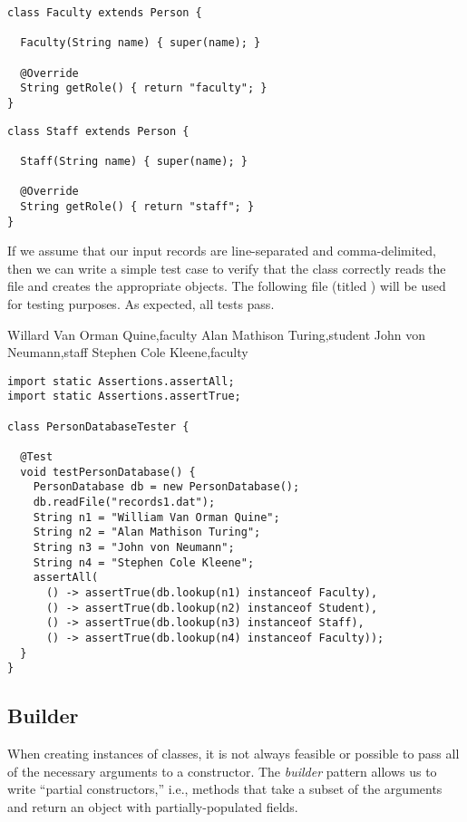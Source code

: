 \begin{lstlisting}[language=MyJava]
class Faculty extends Person {

  Faculty(String name) { super(name); }

  @Override
  String getRole() { return "faculty"; }
}
\end{lstlisting}

\begin{lstlisting}[language=MyJava]
class Staff extends Person {

  Staff(String name) { super(name); }

  @Override
  String getRole() { return "staff"; }
}
\end{lstlisting}

If we assume that our input records are line-separated and comma-delimited, then we can write a simple test case to verify that the  class correctly reads the file and creates the appropriate  objects. 
The following file (titled ) will be used for testing purposes. 
As expected, all tests pass.

\begin{verbnobox}[\small]
Willard Van Orman Quine,faculty
Alan Mathison Turing,student
John von Neumann,staff
Stephen Cole Kleene,faculty
\end{verbnobox}

\begin{lstlisting}[language=MyJava]
import static Assertions.assertAll;
import static Assertions.assertTrue;

class PersonDatabaseTester {

  @Test
  void testPersonDatabase() {
    PersonDatabase db = new PersonDatabase();
    db.readFile("records1.dat");
    String n1 = "William Van Orman Quine";
    String n2 = "Alan Mathison Turing";
    String n3 = "John von Neumann";
    String n4 = "Stephen Cole Kleene";
    assertAll(
      () -> assertTrue(db.lookup(n1) instanceof Faculty),
      () -> assertTrue(db.lookup(n2) instanceof Student),
      () -> assertTrue(db.lookup(n3) instanceof Staff),
      () -> assertTrue(db.lookup(n4) instanceof Faculty));
  }
}
\end{lstlisting}


\subsection{Builder}

When creating instances of classes, it is not always feasible or possible to pass all of the necessary arguments to a constructor. 
The \emph{builder} pattern allows us to write ``partial constructors,'' i.e., methods that take a subset of the arguments and return an object with partially-populated fields.

